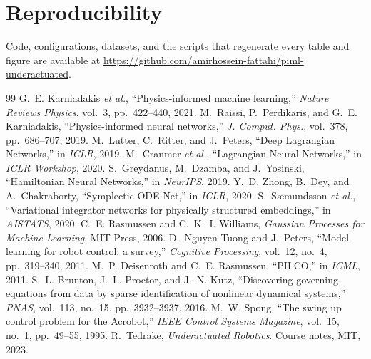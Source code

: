 \documentclass[conference]{IEEEtran}
\begin{document}
\section*{Reproducibility}
Code, configurations, datasets, and the scripts that regenerate every table and
figure are available at
\url{https://github.com/amirhossein-fattahi/piml-underactuated}.

\begin{thebibliography}{99}
 G.~E. Karniadakis \emph{et al.}, ``Physics-informed
machine learning,'' \emph{Nature Reviews Physics}, vol.~3, pp.~422--440, 2021.
 M.~Raissi, P.~Perdikaris, and G.~E. Karniadakis,
``Physics-informed neural networks,'' \emph{J. Comput. Phys.}, vol.~378,
pp.~686--707, 2019.
 M.~Lutter, C.~Ritter, and J.~Peters, ``Deep Lagrangian
Networks,'' in \emph{ICLR}, 2019.
 M.~Cranmer \emph{et al.}, ``Lagrangian Neural Networks,'' in
\emph{ICLR Workshop}, 2020.
 S.~Greydanus, M.~Dzamba, and J.~Yosinski, ``Hamiltonian
Neural Networks,'' in \emph{NeurIPS}, 2019.
 Y.~D. Zhong, B.~Dey, and A.~Chakraborty, ``Symplectic
ODE-Net,'' in \emph{ICLR}, 2020.
 S.~S\ae mundsson \emph{et al.}, ``Variational integrator
networks for physically structured embeddings,'' in \emph{AISTATS}, 2020.
 C.~E. Rasmussen and C.~K.~I. Williams, \emph{Gaussian
Processes for Machine Learning}. MIT Press, 2006.
 D.~Nguyen-Tuong and J.~Peters, ``Model learning for robot
control: a survey,'' \emph{Cognitive Processing}, vol.~12, no.~4, pp.~319--340,
2011.
 M.~P. Deisenroth and C.~E. Rasmussen, ``PILCO,'' in
\emph{ICML}, 2011.
 S.~L. Brunton, J.~L. Proctor, and J.~N. Kutz, ``Discovering
governing equations from data by sparse identification of nonlinear dynamical
systems,'' \emph{PNAS}, vol.~113, no.~15, pp.~3932--3937, 2016.
 M.~W. Spong, ``The swing up control problem for the Acrobot,''
\emph{IEEE Control Systems Magazine}, vol.~15, no.~1, pp.~49--55, 1995.
 R.~Tedrake, \emph{Underactuated Robotics}. Course notes, MIT,
2023.
\end{thebibliography}
\end{document}
